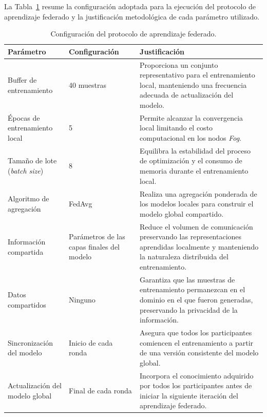 \documentclass[journal,article,submit,moreauthors]{Definitions/mdpi}
\begin{document}
La Tabla~\ref{tab:federated_parameters} resume la configuración adoptada para la ejecución del protocolo de aprendizaje federado y la justificación metodológica de cada parámetro utilizado.

\begin{table}[ht]
\centering
\caption{Configuración del protocolo de aprendizaje federado.}
\label{tab:federated_parameters}
\footnotesize
\begin{tabular}{p{3.3cm}p{2.8cm}p{6.4cm}}
\toprule
\textbf{Parámetro} & \textbf{Configuración} & \textbf{Justificación} \\
\midrule

Buffer de entrenamiento & 40 muestras & Proporciona un conjunto representativo para el entrenamiento local, manteniendo una frecuencia adecuada de actualización del modelo. \\

Épocas de entrenamiento local & 5 & Permite alcanzar la convergencia local limitando el costo computacional en los nodos \textit{Fog}. \\

Tamaño de lote (\textit{batch size}) & 8 & Equilibra la estabilidad del proceso de optimización y el consumo de memoria durante el entrenamiento local. \\

Algoritmo de agregación & FedAvg & Realiza una agregación ponderada de los modelos locales para construir el modelo global compartido. \\

Información compartida & Parámetros de las capas finales del modelo & Reduce el volumen de comunicación preservando las representaciones aprendidas localmente y manteniendo la naturaleza distribuida del entrenamiento. \\

Datos compartidos & Ninguno & Garantiza que las muestras de entrenamiento permanezcan en el dominio en el que fueron generadas, preservando la privacidad de la información. \\

Sincronización del modelo & Inicio de cada ronda & Asegura que todos los participantes comiencen el entrenamiento a partir de una versión consistente del modelo global. \\

Actualización del modelo global & Final de cada ronda & Incorpora el conocimiento adquirido por todos los participantes antes de iniciar la siguiente iteración del aprendizaje federado. \\

\bottomrule
\end{tabular}
\end{table}
\end{document}
